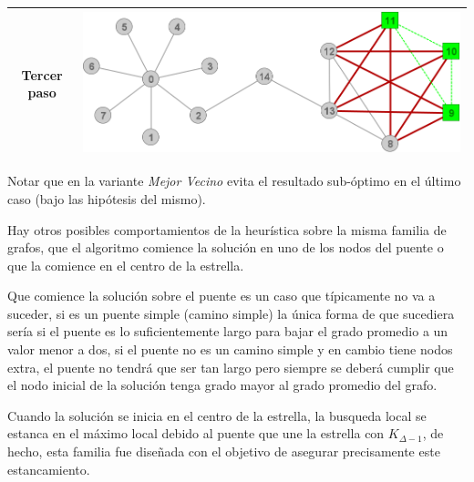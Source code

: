 \begin{itemize}
\begin{center}
\begin{tabular}{|c||c|}
		\hline
		Tercer paso &
		\includegraphics[scale = 0.2]{img/ej3/busqueda_local/estrellaPuenteCMFPar_st03.png} \\
		\hline

	\end{tabular}
	\end{center}


\end{itemize}

Notar que en la variante \emph{Mejor Vecino} evita el resultado sub-\'optimo en 
el \'ultimo caso (bajo las hip\'otesis del mismo).

Hay otros posibles comportamientos de la heur\'istica sobre la misma familia de
grafos, que el algoritmo comience la soluci\'on en uno de los nodos del puente o
que la comience en el centro de la estrella.

Que comience la soluci\'on sobre el puente es un caso que t\'ipicamente no va a 
suceder, si es un puente simple (camino simple) la \'unica forma de que sucediera
ser\'ia si el puente es lo suficientemente largo para bajar el grado promedio a
un valor menor a dos, si el puente no es un camino simple y en cambio tiene nodos
extra, el puente no tendr\'a que ser tan largo pero siempre se deber\'a cumplir
que el nodo inicial de la soluci\'on tenga grado mayor al grado promedio del grafo.

Cuando la soluci\'on se inicia en el centro de la estrella, la busqueda local 
se estanca en el m\'aximo local debido al puente que une la estrella con $K_{\Delta -1}$,
de hecho, esta familia fue dise\~nada con el objetivo de asegurar precisamente
este estancamiento.
		

